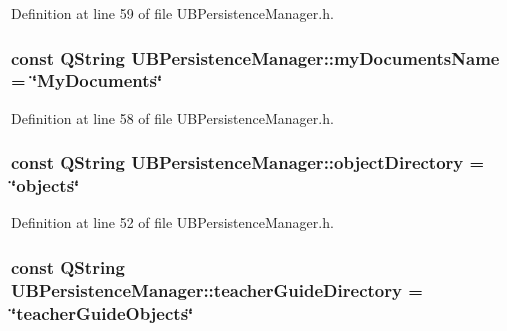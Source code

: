Definition at line 59 of file U\-B\-Persistence\-Manager.\-h.

\hypertarget{class_u_b_persistence_manager_a2e74c9a3298e87f0aca9e9e087ef5dcc}{
\subsubsection[{my\-Documents\-Name}]{\setlength{\rightskip}{0pt plus 5cm}const Q\-String U\-B\-Persistence\-Manager\-::my\-Documents\-Name = \char`\"{}My\-Documents\char`\"{}\hspace{0.3cm}{\ttfamily [static]}}}\label{d0/dd5/class_u_b_persistence_manager_a2e74c9a3298e87f0aca9e9e087ef5dcc}


Definition at line 58 of file U\-B\-Persistence\-Manager.\-h.

\hypertarget{class_u_b_persistence_manager_a12dbae5a490687164448695c8e278f35}{
\subsubsection[{object\-Directory}]{\setlength{\rightskip}{0pt plus 5cm}const Q\-String U\-B\-Persistence\-Manager\-::object\-Directory = \char`\"{}objects\char`\"{}\hspace{0.3cm}{\ttfamily [static]}}}\label{d0/dd5/class_u_b_persistence_manager_a12dbae5a490687164448695c8e278f35}


Definition at line 52 of file U\-B\-Persistence\-Manager.\-h.

\hypertarget{class_u_b_persistence_manager_a7cf10cf338fb0268d89d4b916043da40}{
\subsubsection[{teacher\-Guide\-Directory}]{\setlength{\rightskip}{0pt plus 5cm}const Q\-String U\-B\-Persistence\-Manager\-::teacher\-Guide\-Directory = \char`\"{}teacher\-Guide\-Objects\char`\"{}\hspace{0.3cm}{\ttfamily [static]}}}\label{d0/dd5/class_u_b_persistence_manager_a7cf10cf338fb0268d89d4b916043da40}



